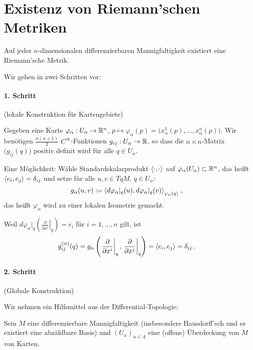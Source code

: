 \documentclass[a4paper,twoside,DIV15,BCOR12mm]{scrbook}
\begin{document}
\section{Existenz von Riemann’schen Metriken}

\begin{satz}
Auf jeder $n$-dimensionalen differenzierbaren Mannigfaltigkeit existiert eine Riemann’sche Metrik.
\label{exriemet}
\end{satz}

\begin{beweis}
Wir gehen in zwei Schritten vor: %
\paragraph*{1. Schritt} (lokale Konstruktion für Kartengebiete)

Gegeben eine Karte $\varphi_\alpha: U_\alpha \to \mathbb{R}^n$, $p\mapsto \varphi_\alpha(p) = \big(x^1_\alpha(p),\ldots,x^n_\alpha(p)\big)$. Wir benötigen $\frac{n(n+1)}2$ $C^\infty$-Funktionen $g_{ij}: U_\alpha \to \mathbb{R}$, so dass die $n\times n$-Matrix $\big(g_{ij}(q)\big)$ positiv definit wird für alle $q\in U_\alpha$.

Eine Möglichkeit: Wähle Standardskalarprodukt $\langle\cdot,\cdot\rangle$ auf $\varphi_\alpha(U_\alpha)\subset \mathbb{R}^n$, das heißt $\langle e_i,e_j\rangle = \delta_{ij}$ und setze für alle $u,v\in TqM$, $q\in U_\alpha$:
\[
g_\alpha(u,v) \da \lsp {d\varphi_{\alpha}|_q(u)} {d\varphi_{\alpha}|_q(v)} _{\varphi_\alpha(q)}\,,
\]
das heißt $\varphi_\alpha$ wird zu einer lokalen Isometrie gemacht.

Weil $d\varphi_\alpha|_q (\left.\frac\partial{\partial x^i}\right|_q) = e_i$ für $i=1,\ldots,n$ gilt, ist
\[
g_{ij}^{(\alpha)}(q) = g_\alpha\left( \left.\frac\partial{\partial x^i}\right|_q, \left.\frac\partial{\partial x^j}\right|_q \right) = \langle e_i,e_j\rangle = \delta_{ij}\,.
\]

\paragraph*{2. Schritt} (Globale Konstruktion)

Wir nehmen ein Hilfsmittel aus der Differential-Topologie:
\begin{satz}
\label{einszerl}
Sein $M$ eine differenzierbare Mannigfaltigkeit (insbesondere Hausdorff’sch und es existiert eine abzählbare Basis) und $(U_\alpha)_{\alpha\in A}$ eine (offene) Überdeckung von $M$ von Karten.


\end{satz}
\end{beweis}
\end{document}
